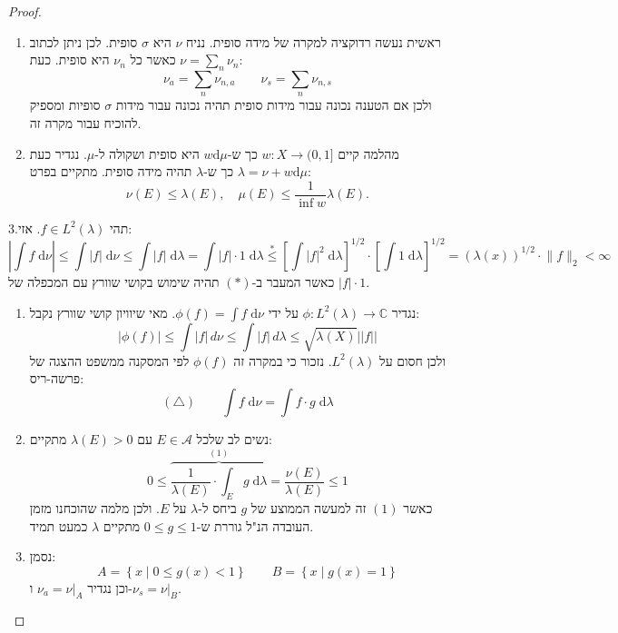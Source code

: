 \documentclass{tstextbook}
\begin{document}
\begin{proof}
  \begin{enumerate}
    \item ראשית נעשה רדוקציה למקרה של מידה סופית. נניח \(\nu\) היא \(\sigma\) סופית. לכן ניתן לכתוב \(\nu=\sum_{n}\nu_{n}\) כאשר כל \(\nu_{n}\) היא סופית. כעת: 
$$\nu_{a}=\sum_{n} \nu_{n,a}\qquad \nu_{s}=\sum_{n}\nu_{n,s}$$
ולכן אם הטענה נכונה עבור מידות סופית תהיה נכונה עבור מידות \(\sigma\) סופיות ומספיק להוכיח עבור מקרה זה.


    \item מהלמה קיים \(w:X\to (0,1]\) כך ש-\(w\mathrm{d}\mu\) היא סופית ושקולה ל-\(\mu\). נגדיר כעת \(\lambda=\nu+w\mathrm{d}\mu\) כך ש-\(\lambda\) תהיה מידה סופית. מתקיים בפרט: 
$$\nu(E)\leq\lambda(E),\quad\mu(E)\leq\frac{1}{\operatorname*{inf}w}\lambda(E).$$


  \end{enumerate}
3.תהי \(f \in L^{2}\left( \lambda \right)\). אזי: 
$$\left\lvert  \int f \;\mathrm{d} \nu   \right\rvert \leq \int \lvert f \rvert  \;\mathrm{d} \nu \leq \int \lvert f \rvert  \;\mathrm{d} \lambda =\int |f|\cdot 1 \;\mathrm{d} \lambda \overset{*}{\leq}  \left[ \int \lvert f \rvert ^{2} \;\mathrm{d} \lambda  \right]^{1/2}\cdot\left[ \int 1 \;\mathrm{d} \lambda  \right]^{1/2}=\left( \lambda(x) \right)^{1/2}\cdot \lVert f \rVert _{2} < \infty$$
כאשר המעבר ב-\((*)\) תהיה שימוש בקושי שוורץ עם המכפלה של \(|f|\cdot 1\). 

  \begin{enumerate}
    \item נגדיר \(\phi:L^{2}\left( \lambda \right)\to \mathbb{C}\) על ידי \(\phi(f)=\int f \;\mathrm{d} \nu\). מאי שיוויון קושי שוורץ נקבל: 
$$|\phi(f)|\leq\int|f|\,d\nu\leq\int|f|\,d\lambda\leq\sqrt{\lambda(X)}||f||$$
ולכן חסום על \(L^{2}\left( \lambda \right)\). נזכור כי במקרה זה \(\phi(f)\) לפי המסקנה ממשפט ההצגה של פרשה-ריס:
$$\left( \triangle \right) \qquad \int f \;\mathrm{d} \nu = \int f \cdot g \;\mathrm{d} \lambda $$


    \item נשים לב שלכל \(E\in \mathcal{A}\) עם \(\lambda(E)>0\) מתקיים: 
$$0\leq\overbrace{ \frac{1}{\lambda(E)}\cdot \int _{E}g \;\mathrm{d} \lambda }^{(1) } = \frac{\nu(E)}{\lambda(E)} \leq 1$$
כאשר \((1)\) זה למעשה הממוצע של \(g\) ביחס ל-\(\lambda\) על \(E\). ולכן מלמה שהוכחנו מזמן העובדה הנ"ל גוררת ש-\(0\leq g \leq 1\) מתקיים \(\lambda\) כמעט תמיד.


    \item נסמן: 
$$A=\left\{  x\mid 0\leq g(x)<1  \right\}\qquad B=\left\{  x\mid g(x)=1  \right\}$$
וכן נגדיר \(\nu_{a}=\nu|_{A}\) ו-\(\nu_{s}=\nu|_{B}\).



\end{enumerate}
\end{proof}
\end{document}

